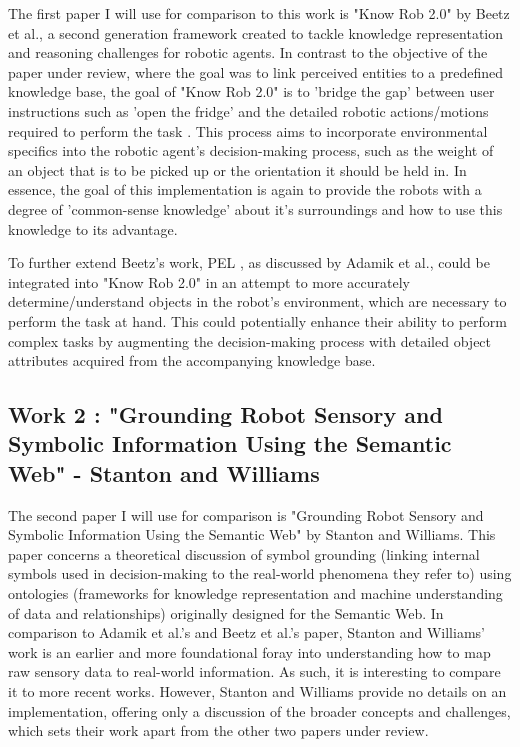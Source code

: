 \documentclass[a4paper,9pt]{scrartcl}
\begin{document}
The first paper I will use for comparison to this work is "Know Rob 2.0" by Beetz et al., a second generation framework created to tackle knowledge representation and reasoning 
challenges for robotic agents. In contrast to the objective of the paper under review, where the goal was to link perceived entities to a predefined knowledge base, the goal 
of "Know Rob 2.0" is to 'bridge the gap' between user instructions such as 'open the fridge' and the detailed robotic actions/motions required to perform the task
\cite{beetzKnowRob202018}. This process aims to incorporate environmental specifics into the robotic agent's decision-making process, such as the weight of an object
that is to be picked up or the orientation it should be held in. In essence, the goal of this implementation is again to provide the robots with a degree of 'common-sense 
knowledge' about it's surroundings and how to use this knowledge to its advantage.

To further extend Beetz's work, PEL \cite{adamikAdvancingRoboticPerception2024}, as discussed by Adamik et al., could be integrated into "Know Rob 2.0" in an attempt to 
more accurately determine/understand objects in the robot's environment, which are necessary to perform the task at hand. This could potentially enhance their ability to 
perform complex tasks by augmenting the decision-making process with detailed object attributes acquired from the accompanying knowledge base.


\subsection{Work 2 : "Grounding Robot Sensory and Symbolic Information Using the Semantic Web" - Stanton and Williams}

The second paper I will use for comparison is "Grounding Robot Sensory and Symbolic Information Using the Semantic Web" by Stanton and Williams. This paper concerns
a theoretical discussion of symbol grounding (linking internal symbols used in decision-making to the real-world phenomena they refer to) \cite{stantonGroundingRobotSensory2004}
using ontologies (frameworks for knowledge representation and machine understanding of data and relationships) originally designed for the Semantic Web. 
In comparison to Adamik et al.'s and Beetz et al.'s paper, Stanton and Williams' work is an earlier and more foundational foray into understanding how to map raw sensory data to 
real-world information. As such, it is interesting to compare it to more recent works. However, Stanton and Williams provide no details on an implementation, offering only a 
discussion of the broader concepts and challenges, which sets their work apart from the other two papers under review.
\end{document}
